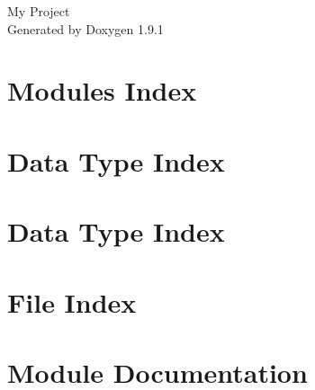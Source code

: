 \let\mypdfximage\pdfximage\def\pdfximage{\immediate\mypdfximage}\documentclass[twoside]{book}
\newcommand{\+}{\discretionary{\mbox{\scriptsize$\hookleftarrow$}}{}{}}
\newcommand{\clearemptydoublepage}{%
  \newpage{\pagestyle{empty}\cleardoublepage}%
}
\begin{document}
\raggedbottom

\hypersetup{pageanchor=false,
             bookmarksnumbered=true,
             pdfencoding=unicode
            }
\begin{titlepage}
\vspace*{7cm}
\begin{center}%
{\Large My Project }\\
\vspace*{1cm}
{\large Generated by Doxygen 1.9.1}\\
\end{center}
\end{titlepage}
\clearemptydoublepage
{}
\tableofcontents
\clearemptydoublepage
{}
\hypersetup{pageanchor=true}

\chapter{Modules Index}

\chapter{Data Type Index}

\chapter{Data Type Index}

\chapter{File Index}

\chapter{Module Documentation}


























\end{document}
